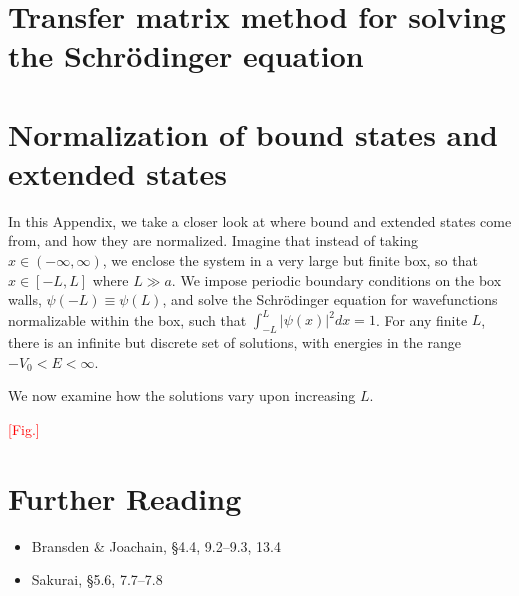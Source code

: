 \documentclass[pra,11pt]{revtex4}
\begin{document}
\appendix
\section{Transfer matrix method for solving the Schr\"odinger equation}


\section{Normalization of bound states and extended states}

In this Appendix, we take a closer look at where bound and extended
states come from, and how they are normalized.  Imagine that instead
of taking $x \in (-\infty,\infty)$, we enclose the system in a very
large but finite box, so that $x \in [-L,L]$ where $L \gg a$.  We
impose periodic boundary conditions on the box walls, $\psi(-L) \equiv
\psi(L)$, and solve the Schr\"odinger equation for wavefunctions
normalizable within the box, such that $\int_{-L}^{L} |\psi(x)|^2 dx =
1$.  For any finite $L$, there is an infinite but discrete set of
solutions, with energies in the range $-V_0 <E < \infty$.

We now examine how the solutions vary upon increasing $L$.

\textcolor{red}{[Fig.]}





\section{Further Reading}

\begin{itemize}
\item Bransden \& Joachain, \S4.4, 9.2--9.3, 13.4
\item Sakurai, \S5.6, 7.7--7.8

\end{itemize}
\end{document}
